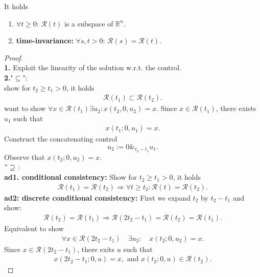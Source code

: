 \begin{lemma}
	It holds
	\begin{enumerate}
		\item $\forall t \ge 0$: $\mathcal{R}(t)$ is a subspace of $\mathbb{R}^n$. 
		\item \textbf{time-invariance:} $\forall s, t > 0$: $\mathcal{R}(s) = \mathcal{R}(t)$. 
	\end{enumerate}
\end{lemma}
\begin{proof}
\quad\\
\textbf{1.} Exploit the linearity of the solution w.r.t. the control. 
\quad\\
\textbf{2.}"$\subseteq$":\\
 show for $t_2 \ge t_1 > 0$, it holds
\begin{align*}
	\mathcal{R}(t_1) \subset \mathcal{R}(t_2). 
\end{align*}
want to show $\forall x \in \mathcal{R}(t_1) \exists u_2 : x(t_2, 0, u_2) = x$. Since $x \in \mathcal{R}(t_1)$, there exists $u_1$ such that 
\begin{align*}
	x(t_1; 0, u_1) = x.
\end{align*}
Construct the concatenating control
\begin{equation}
	u_2:= 0 \&_{t_2 - t_1} u_1. 
\end{equation} 
Observe that $x(t_2; 0, u_2) = x$. 
\quad\\
$"\supseteq$ :\\
\textbf{ad1. conditional consistency:} Show for $t_2 \ge t_1 > 0$, it holds
\begin{align*}
	\mathcal{R}(t_1) = \mathcal{R}(t_2) \Rightarrow \forall t \ge t_2: \mathcal{R}(t) = \mathcal{R}(t_2). 
\end{align*}
\textbf{ad2: discrete conditional consistency: }First we expand $t_2$ by $t_2 - t_1$ and show:
\begin{align*}
	\mathcal{R}(t_2) = \mathcal{R}(t_1) \Rightarrow \mathcal{R}(2t_2 - t_1) = \mathcal{R}(t_2) = \mathcal{R}(t_1). 
\end{align*} 
Equivalent to show
\begin{align*}
	\forall x \in \mathcal{R}(2t_2 - t_1) \quad \exists u_2: \quad x(t_2; 0, u_2) = x.
\end{align*}
Since $x \in \mathcal{R}(2t_2 - t_1)$, there exits $u$ such that
\begin{align*}
	x(2 t_2 - t_1; 0, u ) = x , \text{ and } x(t_2;0, u) \in \mathcal{R}(t_2). 

\end{align*}
\end{proof}
